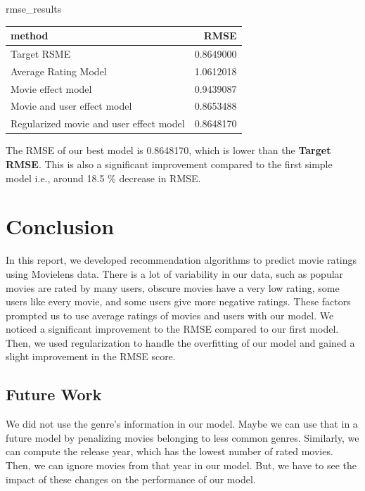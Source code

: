 \documentclass[]{article}
\newenvironment{Shaded}{\begin{snugshade}}{\end{snugshade}}
\newcommand{\NormalTok}[1]{#1}
\begin{document}
\begin{Shaded}
\begin{Highlighting}[]
\NormalTok{rmse_results}
\end{Highlighting}
\end{Shaded}

\begin{longtable}[]{@{}lr@{}}
\toprule
method & RMSE\tabularnewline
\midrule
\endhead
Target RSME & 0.8649000\tabularnewline
Average Rating Model & 1.0612018\tabularnewline
Movie effect model & 0.9439087\tabularnewline
Movie and user effect model & 0.8653488\tabularnewline
Regularized movie and user effect model & 0.8648170\tabularnewline
\bottomrule
\end{longtable}

The RMSE of our best model is 0.8648170, which is lower than the
\textbf{Target RMSE}. This is also a significant improvement compared to
the first simple model i.e., around 18.5 \% decrease in RMSE.

\section{Conclusion}
\label{sec:conclusion}

In this report, we developed recommendation algorithms to predict movie
ratings using Movielens data. There is a lot of variability in our data,
such as popular movies are rated by many users, obscure movies have a
very low rating, some users like every movie, and some users give more
negative ratings. These factors prompted us to use average ratings of
movies and users with our model. We noticed a significant improvement to
the RMSE compared to our first model. Then, we used regularization to
handle the overfitting of our model and gained a slight improvement in
the RMSE score.

\subsection{Future Work}
\label{sec:futurework}

We did not use the genre's information in our model. Maybe we can use
that in a future model by penalizing movies belonging to less common
genres. Similarly, we can compute the release year, which has the lowest
number of rated movies. Then, we can ignore movies from that year in our
model. But, we have to see the impact of these changes on the
performance of our model.
\end{document}
